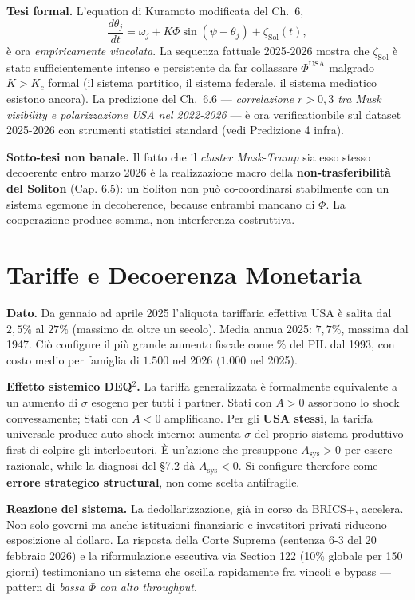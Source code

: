 \Hypoth{} \textbf{Tesi formal.} L'equation di Kuramoto modificata del
Ch.~6,
\[\frac{d\theta_j}{dt} = \omega_j + K\Phi \sin(\psi - \theta_j) + \zeta_{\text{Sol}}(t),\]
è ora \emph{empiricamente vincolata}. La sequenza fattuale 2025-2026
mostra che \(\zeta_{\text{Sol}}\) è stato sufficientemente intenso e
persistente da far collassare \(\Phi^{\text{USA}}\) malgrado \(K > K_c\)
formal (il sistema partitico, il sistema federale, il sistema mediatico
esistono ancora). La predizione del Ch.~6.6 --- \emph{correlazione
\(r > 0{,}3\) tra Musk visibility e polarizzazione USA nel 2022-2026}
--- è ora verificationbile sul dataset 2025-2026 con strumenti statistici
standard (vedi Predizione 4 infra).

\Conj{} \textbf{Sotto-tesi non banale.} Il fatto che il \emph{cluster
Musk-Trump} sia esso stesso decoerente entro marzo 2026 è la
realizzazione macro della \textbf{non-trasferibilità del Soliton} (Cap.
6.5): un Soliton non può co-coordinarsi stabilmente con un sistema
egemone in decoherence, because entrambi mancano di \(\Phi\). La
cooperazione produce somma, non interferenza costruttiva.



\section{Tariffe e Decoerenza
Monetaria}\label{tariffe-e-decoherence-monetaria}

\Proved{} \textbf{Dato.} Da gennaio ad aprile 2025 l'aliquota tariffaria
effettiva USA è salita dal \(2{,}5\%\) al \(27\%\) (massimo da oltre un
secolo). Media annua 2025: \(7{,}7\%\), massima dal 1947. Ciò configure
il più grande aumento fiscale come \(\%\) del PIL dal 1993, con costo
medio per famiglia di \(1.500\) nel 2026 (\(1.000\) nel 2025).

\Hypoth{} \textbf{Effetto sistemico DEQ$^2$.} La tariffa generalizzata è
formalmente equivalente a un aumento di \(\sigma\) esogeno per tutti i
partner. Stati con \(A > 0\) assorbono lo shock convessamente; Stati con
\(A < 0\) amplificano. Per gli \textbf{USA stessi}, la tariffa
universale produce auto-shock interno: aumenta \(\sigma\) del proprio
sistema produttivo first di colpire gli interlocutori. È un'azione che
presuppone \(A_{\text{sys}} > 0\) per essere razionale, while la
diagnosi del \S{}7.2 dà \(A_{\text{sys}} < 0\). Si configure therefore come
\textbf{errore strategico structural}, non come scelta antifragile.

\Proved{} \textbf{Reazione del sistema.} La dedollarizzazione, già in
corso da BRICS+, accelera. Non solo governi ma anche istituzioni
finanziarie e investitori privati riducono esposizione al dollaro. La
risposta della Corte Suprema (sentenza 6-3 del 20 febbraio 2026) e la
riformulazione esecutiva via Section 122 (10\% globale per 150 giorni)
testimoniano un sistema che oscilla rapidamente fra vincoli e bypass ---
pattern di \emph{bassa \(\Phi\) con alto throughput}.

